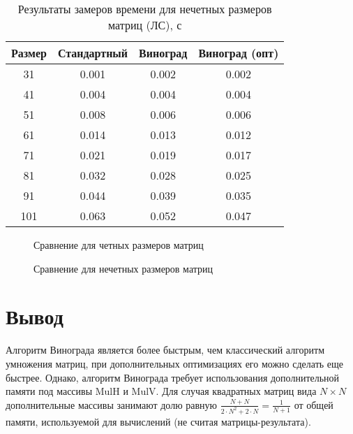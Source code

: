 \documentclass{bmstu}
\begin{document}
\begin{table}[h]
    \begin{center}
        \begin{threeparttable}
        \captionsetup{justification=raggedright,singlelinecheck=off}
        \caption{Результаты замеров времени для нечетных размеров матриц (ЛС), с}
        \label{tbl:time_mes_odd}
        \begin{tabular}{|c|c|c|c|}
            \hline
            Размер & Стандартный & Виноград & Виноград (опт) \\
            \hline
            31    & 0.001 & 0.002 & 0.002 \\
            \hline
            41    & 0.004& 0.004 & 0.004\\
            \hline
            51    & 0.008& 0.006 & 0.006\\
            \hline
            61    & 0.014&0.013 &0.012\\
            \hline
            71    & 0.021& 0.019& 0.017 \\
            \hline
            81    & 0.032& 0.028& 0.025\\
            \hline
            91    & 0.044& 0.039 & 0.035 \\
            \hline
            101    & 0.063& 0.052 & 0.047\\
            \hline
		\end{tabular}
    \end{threeparttable}
\end{center}
\end{table}
\newpage

\begin{figure}[h]
 \centering
 
 \caption{Сравнение для четных размеров матриц}
 \label{fig:even}
\end{figure}
\newpage

\begin{figure}[h]
 \centering
 
 \caption{Сравнение для нечетных размеров матриц}
 \label{fig:odd}
\end{figure}
\newpage

\section*{Вывод}
Алгоритм Винограда является более быстрым, чем классический алгоритм умножения матриц, при дополнительных оптимизациях его можно сделать еще быстрее. Однако, алгоритм Винограда требует использования дополнительной памяти под массивы MulH и MulV. Для случая квадратных матриц вида $N \times N$ дополнительные массивы занимают долю равную $\frac{N + N}{2\cdot N^2 + 2\cdot N} = \frac{1}{N + 1}$ от общей памяти, используемой для вычислений (не считая матрицы-результата).
\end{document}
